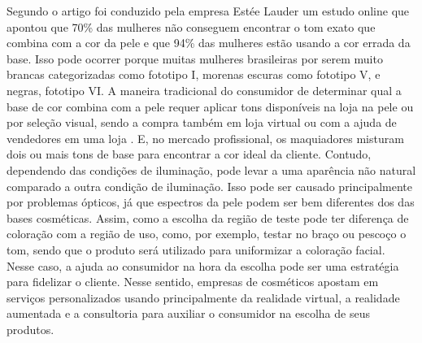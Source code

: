 Segundo o artigo \cite{Snap_and_match_a_case_study_of_virtual_color_cosmetics_consultation} foi conduzido pela empresa Estée Lauder um estudo online que apontou que 70\% das mulheres não conseguem encontrar o tom exato que combina com a cor da pele e que 94\% das mulheres estão usando a cor errada da base. Isso pode ocorrer porque muitas mulheres brasileiras por serem muito brancas categorizadas como fototipo I, morenas escuras como fototipo V, e  negras, fototipo VI\cite{Régua_de_Pele_Linha_de_Maquiagem_para_a_Mulher_Brasileira}.
A maneira tradicional do consumidor de determinar qual a base de cor combina com a pele requer aplicar tons disponíveis na loja na pele \cite{A_development_of_a_portable_device_for_skin_color_estimation_on_cosmetic_foundation_applying} ou por seleção visual, sendo a compra também em loja virtual ou com a ajuda de vendedores em uma loja \cite{Snap_and_match_a_case_study_of_virtual_color_cosmetics_consultation}.
E, no mercado profissional, os maquiadores misturam dois ou mais tons de base para encontrar a cor ideal da cliente. Contudo, dependendo das condições de iluminação, pode levar a uma aparência não natural comparado a outra condição de iluminação.  Isso pode ser causado principalmente por problemas ópticos, já que espectros da pele podem ser bem diferentes dos das bases cosméticas. Assim, como a escolha da região de teste pode ter diferença de coloração com a região de uso, como, por exemplo, testar no braço ou pescoço o tom, sendo que o produto será utilizado para uniformizar a coloração facial. Nesse caso, a ajuda ao consumidor na hora da escolha pode ser uma estratégia para fidelizar o cliente.
Nesse sentido, empresas de cosméticos apostam em serviços personalizados usando principalmente da realidade virtual, a realidade aumentada e a consultoria para auxiliar o consumidor na escolha de seus produtos.


